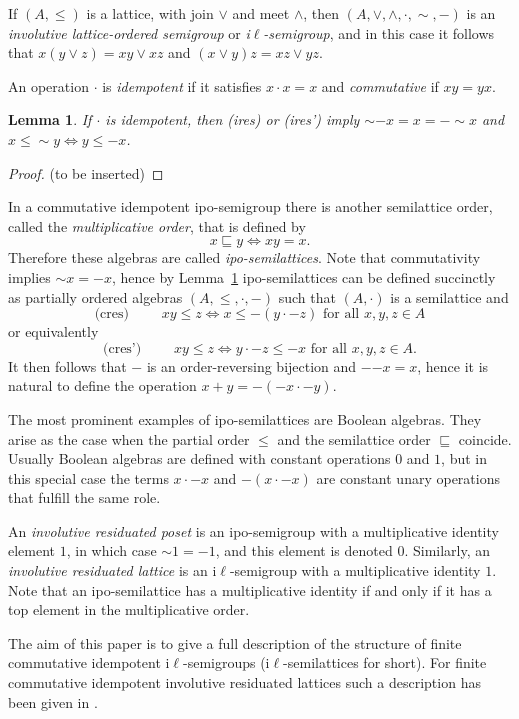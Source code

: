 \documentclass[12pt]{amsart}
\newtheorem{lemma}[theorem]{Lemma}
\renewcommand{\ln}{{\sim}}
\newcommand{\rn}{{-}}
\begin{document}
If $(A,\le)$ is a lattice, with join $\vee$ and meet $\wedge$, then $(A,\vee,\wedge,\cdot,\sim,-)$ is an \emph{involutive lattice-ordered semigroup} or \emph{i$\ell$-semigroup}, and in this case it follows that $x(y\vee z)=xy\vee xz$ and $(x\vee y)z=xz\vee yz$.

An operation $\cdot$ is \emph{idempotent} if it satisfies $x\cdot x=x$ and
\emph{commutative} if $xy=yx$.
\begin{lemma}\label{idem}
If $\cdot$ is idempotent, then \textup{(ires)} or \textup{(ires')} imply $\ln\rn x=x=\rn\ln x$ and $x\le \ln y\iff y\le\rn x$.
\end{lemma}
\begin{proof} (to be inserted)
\end{proof}
In a commutative idempotent ipo-semigroup there is another semilattice order, called the \emph{multiplicative order}, that is defined by
$$x\sqsubseteq y \iff xy=x.$$ Therefore these algebras are called \emph{ipo-semilattices}.
Note that commutativity implies $\ln x = \rn x$, hence by Lemma~\ref{idem} ipo-semilattices can be defined succinctly as partially ordered algebras $(A,\le,\cdot,-)$ such that $(A,\cdot)$ is a semilattice
and
$$\text{(cres) }\qquad xy\le z\iff x\le \rn(y\cdot\rn z)\text{ \ \  for all }x,y,z\in A$$
or equivalently
$$\text{(cres') }\qquad xy\le z\iff y\cdot\rn z\le \rn x\text{ \ \  for all }x,y,z\in A.$$
It then follows that $-$ is an order-reversing bijection and $-{-x}=x$, hence it is natural to define the operation $x+y=-(-x\cdot -y)$.

The most prominent examples of ipo-semilattices are Boolean algebras. They arise as the case when the partial order $\le$ and the semilattice order $\sqsubseteq$ coincide. Usually Boolean algebras are defined with constant operations $0$ and $1$, but in this special case the terms $x\cdot -x$ and $-(x\cdot -x)$ are constant unary operations that fulfill the same role.

An \emph{involutive residuated poset} is an ipo-semigroup with a multiplicative identity element $1$, in which case $\ln 1=\rn 1$, and this element is denoted $0$. Similarly, an \emph{involutive residuated lattice} is an i$\ell$-semigroup with a multiplicative identity $1$.
Note that an ipo-semilattice has a multiplicative identity if and only if
it has a top element in the multiplicative order.

The aim of this paper is to give a full description of the structure of finite commutative idempotent i$\ell$-semigroups (i$\ell$-semilattices for short). For finite commutative idempotent involutive residuated lattices such a description has been given in \cite{JTV2020}.
\end{document}
